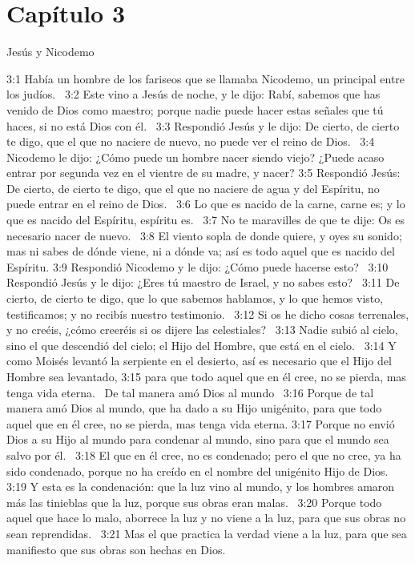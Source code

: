 \section*{Capítulo 3}
Jesús y Nicodemo  

3:1 Había un hombre de los fariseos que se llamaba Nicodemo, un principal entre los judíos.  
3:2 Este vino a Jesús de noche, y le dijo: Rabí, sabemos que has venido de Dios como maestro; porque nadie puede hacer estas señales que tú haces, si no está Dios con él.  
3:3 Respondió Jesús y le dijo: De cierto, de cierto te digo, que el que no naciere de nuevo, no puede ver el reino de Dios.  
3:4 Nicodemo le dijo: ¿Cómo puede un hombre nacer siendo viejo? ¿Puede acaso entrar por segunda vez en el vientre de su madre, y nacer? 
3:5 Respondió Jesús: De cierto, de cierto te digo, que el que no naciere de agua y del Espíritu, no puede entrar en el reino de Dios.  
3:6 Lo que es nacido de la carne, carne es; y lo que es nacido del Espíritu, espíritu es.  
3:7 No te maravilles de que te dije: Os es necesario nacer de nuevo.  
3:8 El viento sopla de donde quiere, y oyes su sonido; mas ni sabes de dónde viene, ni a dónde va; así es todo aquel que es nacido del Espíritu. 
3:9 Respondió Nicodemo y le dijo: ¿Cómo puede hacerse esto?  
3:10 Respondió Jesús y le dijo: ¿Eres tú maestro de Israel, y no sabes esto?  
3:11 De cierto, de cierto te digo, que lo que sabemos hablamos, y lo que hemos visto, testificamos; y no recibís nuestro testimonio.  
3:12 Si os he dicho cosas terrenales, y no creéis, ¿cómo creeréis si os dijere las celestiales?  
3:13 Nadie subió al cielo, sino el que descendió del cielo; el Hijo del Hombre, que está en el cielo.  
3:14 Y como Moisés levantó la serpiente en el desierto, así es necesario que el Hijo del Hombre sea levantado, 
3:15 para que todo aquel que en él cree, no se pierda, mas tenga vida eterna.  
De tal manera amó Dios al mundo  
3:16 Porque de tal manera amó Dios al mundo, que ha dado a su Hijo unigénito, para que todo aquel que en él cree, no se pierda, mas tenga vida eterna. 
3:17 Porque no envió Dios a su Hijo al mundo para condenar al mundo, sino para que el mundo sea salvo por él.  
3:18 El que en él cree, no es condenado; pero el que no cree, ya ha sido condenado, porque no ha creído en el nombre del unigénito Hijo de Dios.  
3:19 Y esta es la condenación: que la luz vino al mundo, y los hombres amaron más las tinieblas que la luz, porque sus obras eran malas.  
3:20 Porque todo aquel que hace lo malo, aborrece la luz y no viene a la luz, para que sus obras no sean reprendidas.  
3:21 Mas el que practica la verdad viene a la luz, para que sea manifiesto que sus obras son hechas en Dios.  
